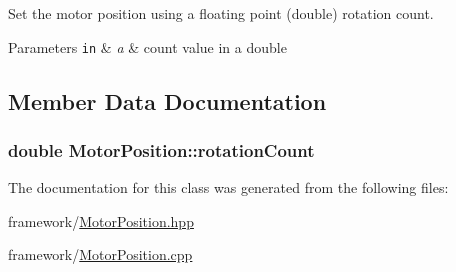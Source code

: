 Set the motor position using a floating point (double) rotation count. 


\begin{DoxyParams}[1]{Parameters}
\mbox{\tt in}  & {\em a} & count value in a double \\
\hline
\end{DoxyParams}


\subsection{Member Data Documentation}
\hypertarget{classMotorPosition_aa275f06359509a8e951fbde9e7b55a36}{
\subsubsection[{rotation\-Count}]{\setlength{\rightskip}{0pt plus 5cm}double Motor\-Position\-::rotation\-Count\hspace{0.3cm}{\ttfamily [private]}}}\label{classMotorPosition_aa275f06359509a8e951fbde9e7b55a36}


The documentation for this class was generated from the following files\-:\begin{DoxyCompactItemize}
\item 
framework/\hyperlink{MotorPosition_8hpp}{Motor\-Position.\-hpp}\item 
framework/\hyperlink{MotorPosition_8cpp}{Motor\-Position.\-cpp}\end{DoxyCompactItemize}
